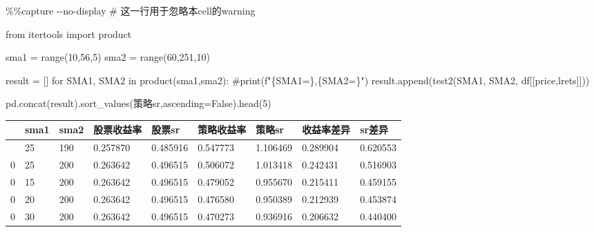 \documentclass[
  letterpaper,
  DIV=11,
  numbers=noendperiod]{scrreprt}
\newenvironment{Shaded}{\begin{snugshade}}{\end{snugshade}}
\newcommand{\BuiltInTok}[1]{\textcolor[rgb]{0.00,0.23,0.31}{#1}}
\newcommand{\CommentTok}[1]{\textcolor[rgb]{0.37,0.37,0.37}{#1}}
\newcommand{\ControlFlowTok}[1]{\textcolor[rgb]{0.00,0.23,0.31}{#1}}
\newcommand{\DecValTok}[1]{\textcolor[rgb]{0.68,0.00,0.00}{#1}}
\newcommand{\ImportTok}[1]{\textcolor[rgb]{0.00,0.46,0.62}{#1}}
\newcommand{\KeywordTok}[1]{\textcolor[rgb]{0.00,0.23,0.31}{#1}}
\newcommand{\NormalTok}[1]{\textcolor[rgb]{0.00,0.23,0.31}{#1}}
\newcommand{\OperatorTok}[1]{\textcolor[rgb]{0.37,0.37,0.37}{#1}}
\newcommand{\StringTok}[1]{\textcolor[rgb]{0.13,0.47,0.30}{#1}}
\newcommand{\VariableTok}[1]{\textcolor[rgb]{0.07,0.07,0.07}{#1}}
\begin{document}
\begin{Shaded}
\begin{Highlighting}[]
\OperatorTok{\%\%}\NormalTok{capture }\OperatorTok{{-}{-}}\NormalTok{no}\OperatorTok{{-}}\NormalTok{display }
\CommentTok{\# 这一行用于忽略本cell的warning}

\ImportTok{from}\NormalTok{ itertools }\ImportTok{import}\NormalTok{ product}

\NormalTok{sma1 }\OperatorTok{=} \BuiltInTok{range}\NormalTok{(}\DecValTok{10}\NormalTok{,}\DecValTok{56}\NormalTok{,}\DecValTok{5}\NormalTok{) }
\NormalTok{sma2 }\OperatorTok{=} \BuiltInTok{range}\NormalTok{(}\DecValTok{60}\NormalTok{,}\DecValTok{251}\NormalTok{,}\DecValTok{10}\NormalTok{)}

\NormalTok{result }\OperatorTok{=}\NormalTok{ []}
\ControlFlowTok{for}\NormalTok{ SMA1, SMA2 }\KeywordTok{in}\NormalTok{ product(sma1,sma2):}
    \CommentTok{\#print(f"\{SMA1=\},\{SMA2=\}")}
\NormalTok{    result.append(test2(SMA1, SMA2, df[[}\StringTok{\textquotesingle{}price\textquotesingle{}}\NormalTok{,}\StringTok{\textquotesingle{}lrets\textquotesingle{}}\NormalTok{]]))}

\NormalTok{pd.concat(result).sort\_values(}\StringTok{\textquotesingle{}策略sr\textquotesingle{}}\NormalTok{,ascending}\OperatorTok{=}\VariableTok{False}\NormalTok{).head(}\DecValTok{5}\NormalTok{)}
\end{Highlighting}
\end{Shaded}

\begin{longtable}[]{@{}lllllllll@{}}
\toprule\noalign{}
& sma1 & sma2 & 股票收益率 & 股票sr & 策略收益率 & 策略sr & 收益率差异 &
sr差异 \\
\midrule\noalign{}
\endhead
\bottomrule\noalign{}
\endlastfoot
0 & 25 & 190 & 0.257870 & 0.485916 & 0.547773 & 1.106469 & 0.289904 &
0.620553 \\
0 & 25 & 200 & 0.263642 & 0.496515 & 0.506072 & 1.013418 & 0.242431 &
0.516903 \\
0 & 15 & 200 & 0.263642 & 0.496515 & 0.479052 & 0.955670 & 0.215411 &
0.459155 \\
0 & 20 & 200 & 0.263642 & 0.496515 & 0.476580 & 0.950389 & 0.212939 &
0.453874 \\
0 & 30 & 200 & 0.263642 & 0.496515 & 0.470273 & 0.936916 & 0.206632 &
0.440400 \\
\end{longtable}
\end{document}
